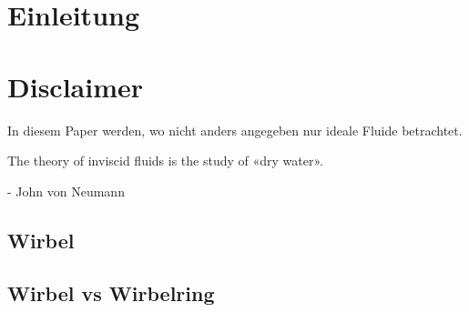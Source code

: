 \section{Einleitung}



\section*{Disclaimer}

In diesem Paper werden, wo nicht anders angegeben nur ideale Fluide betrachtet.

\begin{displayquote}
    The theory of inviscid fluids is the study of «dry water».

    - John von Neumann\cite{Wirbelringe:feynman1964lectures}
\end{displayquote}

\subsection{Wirbel}


\subsection{Wirbel vs Wirbelring}
